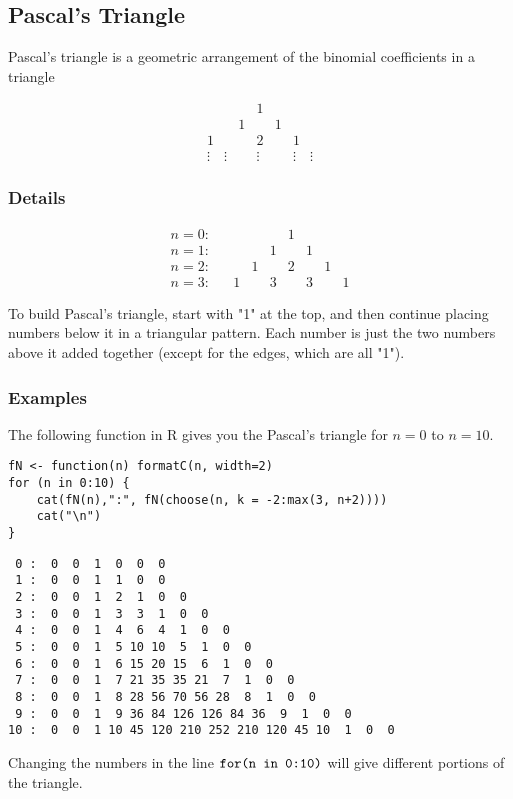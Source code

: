 \documentclass[12pt,a4paper]{article}
\theoremstyle{regla}
\theoremstyle{remark}
\theoremstyle{definition}
\theoremstyle{nonumberbreak}
\begin{document}
\subsection{Pascal's Triangle}
\begin{fbox}
\begin{minipage}{0.97\textwidth}
Pascal's triangle is a geometric arrangement of the binomial coefficients in a triangle

$$
\begin{array}{ccccc}
  & & 1 & &\\
  & 1 & & 1&\\
  1 & & 2 & & 1\\
  \vdots \quad \vdots && \vdots && \vdots \quad \vdots
\end{array}
$$

\end{minipage}
\end{fbox}

\subsubsection{Details}

$$
\begin{array}{ccccccccc}
  n=0: & & & & &1& & & \\
  n=1: & & & &1& &1& & \\
  n=2: & & &1& &2& &1& \\
  n=3: & &1& &3& &3& &1
\end{array}
$$

To build Pascal's triangle, start with "1" at the top, and then continue placing numbers below it in a triangular pattern. Each number is just the two numbers above it added together (except for the edges, which are all "1").

\subsubsection{Examples}
\begin{xmpl}
The following function in R gives you the Pascal's triangle for $n= 0$ to $n=10$.

\begin{lstlisting}
fN <- function(n) formatC(n, width=2)
for (n in 0:10) {
    cat(fN(n),":", fN(choose(n, k = -2:max(3, n+2))))
    cat("\n")
}
\end{lstlisting}

\begin{verbatim}
 0 :  0  0  1  0  0  0
 1 :  0  0  1  1  0  0
 2 :  0  0  1  2  1  0  0
 3 :  0  0  1  3  3  1  0  0
 4 :  0  0  1  4  6  4  1  0  0
 5 :  0  0  1  5 10 10  5  1  0  0
 6 :  0  0  1  6 15 20 15  6  1  0  0
 7 :  0  0  1  7 21 35 35 21  7  1  0  0
 8 :  0  0  1  8 28 56 70 56 28  8  1  0  0
 9 :  0  0  1  9 36 84 126 126 84 36  9  1  0  0
10 :  0  0  1 10 45 120 210 252 210 120 45 10  1  0  0
\end{verbatim}

Changing the numbers in the line $\verb|for(n in 0:10)|$ will give different portions of the triangle.
\end{xmpl}
\end{document}
